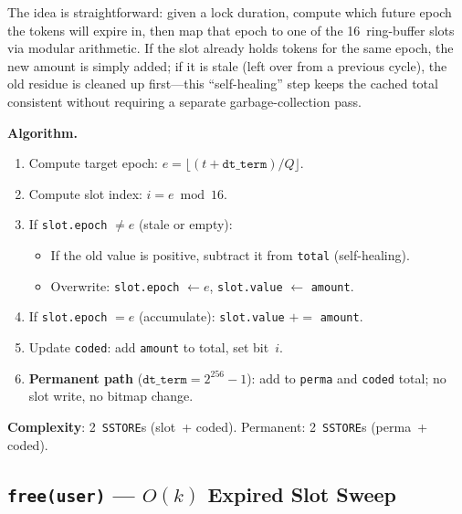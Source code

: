 \documentclass[10pt,a4paper,twocolumn]{article}
\theoremstyle{definition}
\theoremstyle{plain}
\theoremstyle{remark}
\begin{document}
The idea is straightforward: given a lock duration, compute which future epoch the tokens will expire in, then map that epoch to one of the 16~ring-buffer slots via modular arithmetic.  If the slot already holds tokens for the same epoch, the new amount is simply added; if it is stale (left over from a previous cycle), the old residue is cleaned up first---this ``self-healing'' step keeps the cached total consistent without requiring a separate garbage-collection pass.

\textbf{Algorithm.}
\begin{enumerate}[leftmargin=*, nosep]
\item Compute target epoch: $e = \lfloor(t + \texttt{dt\_term}) / Q\rfloor$.
\item Compute slot index: $i = e \bmod 16$.
\item If \texttt{slot.epoch} $\neq e$ (stale or empty):
    \begin{itemize}[nosep]
    \item If the old value is positive, subtract it from \texttt{total} (self-healing).
    \item Overwrite: \texttt{slot.epoch} $\leftarrow e$, \texttt{slot.value} $\leftarrow$ \texttt{amount}.
    \end{itemize}
\item If \texttt{slot.epoch} $= e$ (accumulate): \texttt{slot.value} $\mathrel{+}=$ \texttt{amount}.
\item Update \texttt{coded}: add \texttt{amount} to total, set bit~$i$.
\item \textbf{Permanent path} ($\texttt{dt\_term} = 2^{256}{-}1$): add to \texttt{perma} and \texttt{coded} total; no slot write, no bitmap change.
\end{enumerate}

\textbf{Complexity}: 2~\texttt{SSTORE}s (slot~+ coded). Permanent: 2~\texttt{SSTORE}s (perma~+ coded).

\subsection{\texttt{free(user)} --- $O(k)$ Expired Slot Sweep}
\label{subsec:free}
\end{document}
